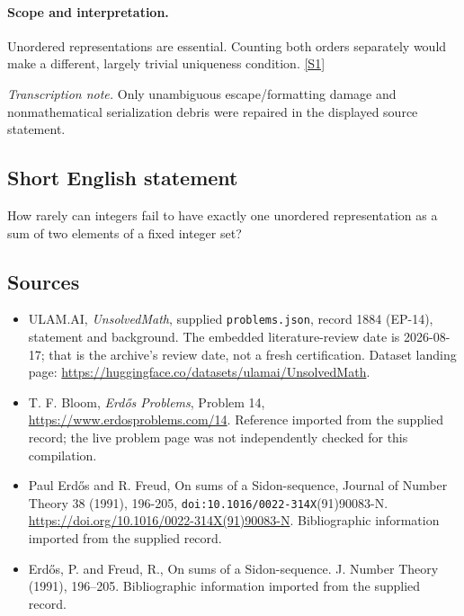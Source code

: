 \documentclass[11pt,a4paper]{article}
\newcommand{\sref}[2]{\hyperlink{source:#1:#2}{[S#2]}}
\begin{document}
\paragraph{Scope and interpretation.}

Unordered representations are essential. Counting both orders separately would make a different, largely trivial uniqueness condition. \sref{1884}{1}

{\small\emph{Transcription note.} Only unambiguous escape/formatting damage and nonmathematical serialization debris were repaired in the displayed source statement.}

\subsection{Short English statement}

How rarely can integers fail to have exactly one unordered representation as a sum of two elements of a fixed integer set?

\subsection{Sources}

{\small

\begin{itemize}

\item[\hypertarget{source:1884:1}{S1}] ULAM.AI, \emph{UnsolvedMath}, supplied \texttt{problems.json}, record 1884 (EP-14), statement and background. The embedded literature-review date is 2026-08-17; that is the archive’s review date, not a fresh certification. Dataset landing page: \url{https://huggingface.co/datasets/ulamai/UnsolvedMath}.

\item[\hypertarget{source:1884:2}{S2}] T. F. Bloom, \emph{Erdős Problems}, Problem 14, \url{https://www.erdosproblems.com/14}. Reference imported from the supplied record; the live problem page was not independently checked for this compilation.

\item[\hypertarget{source:1884:3}{S3}] Paul Erdős and R. Freud, On sums of a Sidon-sequence, Journal of Number Theory 38 (1991), 196-205, \nolinkurl{doi:10.1016/0022-314X}(91)90083-N. \url{https://doi.org/10.1016/0022-314X(91)90083-N}. Bibliographic information imported from the supplied record.

\item[\hypertarget{source:1884:4}{S4}] Erd\H{o}s, P. and Freud, R., On sums of a {S}idon-sequence. J. Number Theory (1991), 196--205. Bibliographic information imported from the supplied record.

\end{itemize}

}

\label{end:1884}
\end{document}
